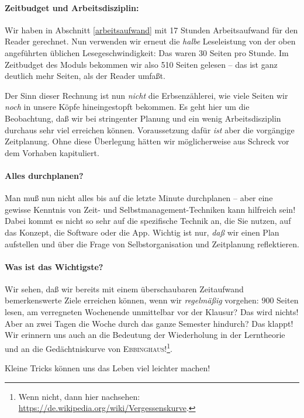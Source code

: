 \paragraph{Zeitbudget und Arbeitsdisziplin:}
Wir haben in Abschnitt \ref{arbeitsaufwand} mit 17 Stunden Arbeitsaufwand für den Reader gerechnet.
Nun verwenden wir erneut die \textit{halbe} Leseleistung von der oben angeführten üblichen Lesegeschwindigkeit:
Das waren 30 Seiten pro Stunde.
Im Zeitbudget des Moduls bekommen wir also 510 Seiten gelesen -- das ist ganz deutlich mehr Seiten, als der Reader umfaßt.

Der Sinn dieser Rechnung ist nun \textit{nicht} die Erbsenzählerei, wie viele Seiten wir \textit{noch} in unsere Köpfe hineingestopft bekommen.
Es geht hier um die Beobachtung, daß wir bei stringenter Planung und ein wenig Arbeitsdisziplin durchaus sehr viel
erreichen können. Voraussetzung dafür \textit{ist} aber die vorgängige Zeitplanung. Ohne diese Überlegung hätten wir 
möglicherweise aus Schreck vor dem Vorhaben kapituliert.


\paragraph{Alles durchplanen?}
Man muß nun nicht alles bis auf die letzte Minute durchplanen -- aber eine
gewisse Kenntnis von Zeit- und Selbstmanagement-Techniken kann hilfreich sein!
Dabei kommt es nicht so sehr auf die spezifische Technik an, die Sie nutzen, 
auf das Konzept, die Software oder die App.
Wichtig ist nur, \textit{daß} wir einen Plan aufstellen und über die Frage
von Selbstorganisation und Zeitplanung reflektieren.

\paragraph{Was ist das Wichtigste?}
Wir sehen, daß wir bereits mit einem über\-schau\-ba\-ren Zeitaufwand bemerkenswerte Ziele erreichen können, wenn wir
\textit{regelmäßig} vorgehen:
$900$ Seiten lesen, am verregneten Wochenende unmittelbar vor der Klausur?
Das wird nichts! Aber an zwei Tagen die Woche durch das ganze Semester hindurch? Das klappt!
Wir erinnern uns auch an die Bedeutung der Wiederholung in der Lerntheorie
und an die Gedächtniskurve von \textsc{Ebbinghaus}!\footnote{Wenn nicht, dann
hier nachsehen: \url{https://de.wikipedia.org/wiki/Vergessenskurve}.}.

Kleine Tricks können uns das Leben viel leichter machen!


